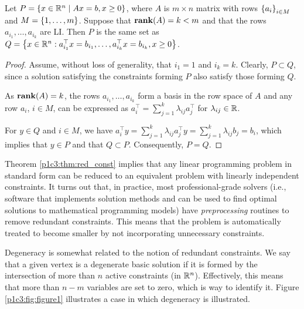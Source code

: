\begin{theorem}\label{p1c3:thm:red_const}
	Let $P = \left\{ x \in \mathbb{R}^n \mid Ax = b, x \geq 0 \right \}$, where $A$ is $m \times n$ matrix with rows $\left\{ a_i \right \}_{i \in M}$ and $M = \left\{ 1,\dots,m \right \}$. Suppose that $\mathop{\bf rank}(A) = k < m$ and that the rows $a_{i_1}, \dots, a_{i_k}$ are LI. Then $P$ is the same set as $Q = \left\{  x \in \mathbb{R}^n : a^\top_{i_1}x = b_{i_1}, \dots, a^\top_{i_k}x = b_{i_k}, x \geq 0 \right \}$.
\end{theorem}

\begin{proof}
	Assume, without loss of generality, that $i_1 = 1$ and $i_k = k$. Clearly, $P \subset Q$, since a solution satisfying the constraints forming $P$ also satisfy those forming $Q$.
	
	As $\mathop{\bf rank}(A) = k$, the rows $a_{i_1}, \dots, a_{i_k}$ form a basis in the row space of $A$ and any row $a_i$, $i \in M$, can be expressed as $a^\top_i = \sum_{j=1}^k \lambda_{ij}a_j^\top$ for $\lambda_{ij} \in \mathbb{R}$.
	
	For $y \in Q$ and $i \in M$, we have $a_i^\top y = \sum_{j=1}^k \lambda_{ij}a_j^\top y = \sum_{j=1}^k \lambda_{ij}b_{j} = b_i$, which implies that $y \in P$ and that $Q \subset P$. Consequently, $P = Q$. \qedhere			
\end{proof}

Theorem \ref{p1c3:thm:red_const} implies that any linear programming problem in standard form can be reduced to an equivalent problem with linearly independent constraints. It turns out that, in practice, most professional-grade solvers (i.e., software that implements solution methods and can be used to find optimal solutions to mathematical programming models) have \emph{preprocessing} routines to remove redundant constraints. This means that the problem is automatically treated to become smaller by not incorporating unnecessary constraints. 

Degeneracy is somewhat related to the notion of redundant constraints. We say that a given vertex is a degenerate basic solution if it is formed by the intersection of more than $n$ active constraints (in $\mathbb{R}^n$). Effectively, this means that more than $n-m$ variables are set to zero, which is way to identify it. Figure \ref{p1c3:fig:figure1} illustrates a case in which degeneracy is illustrated.


